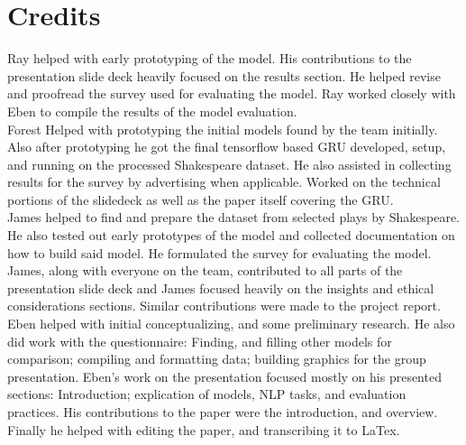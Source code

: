\documentclass[11pt,a4paper]{article}
\begin{document}
\section{Credits}
Ray helped with early prototyping of the model. His contributions to the presentation slide deck heavily focused on the results section. He helped revise and proofread the survey used for evaluating the model. Ray worked closely with Eben to compile the results of the model evaluation.\\
Forest Helped with prototyping the initial models found by the team initially. Also after prototyping he got the final tensorflow based GRU developed, setup, and running on the processed Shakespeare dataset. He also assisted in collecting results for the survey by advertising when applicable. Worked on the technical portions of the slidedeck as well as the paper itself covering the GRU.\\
James helped to find and prepare the dataset from selected plays by Shakespeare. He also tested out early prototypes of the model and collected documentation on how to build said model. He formulated the survey for evaluating the model. James, along with everyone on the team, contributed to all parts of the presentation slide deck and James focused heavily on the insights and ethical considerations sections. Similar contributions were made to the project report.\\
Eben helped with initial conceptualizing, and some preliminary research. He also did work with the questionnaire: Finding, and filling other models for comparison; compiling and formatting data; building graphics for the group presentation. Eben’s work on the presentation focused mostly on his presented sections: Introduction; explication of models, NLP tasks, and evaluation practices. His contributions to the paper were the introduction, and overview. Finally he helped with editing the paper, and transcribing it to LaTex.
\end{document}
